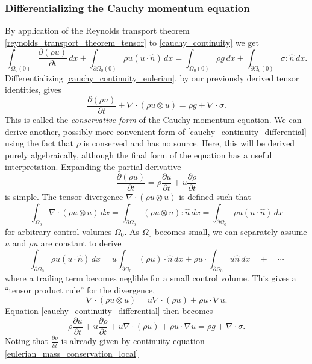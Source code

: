 \documentclass[11pt,a4paper]{memoir}
\newcommand{\pomn}{{\partial\Omega_0}}
\newcommand{\Part}[2]{\frac{\partial #1}{\partial #2}}
\begin{document}
\subsubsection{Differentializing the Cauchy momentum equation}
By application of the Reynolds transport theorem \eqref{reynolds_transport_theorem_tensor} to \eqref{cauchy_continuity} we get
\begin{equation}\label{cauchy_continuity_eulerian}
    \int_{\Omega_0(0)}\Part{(\rho u)}{t}\,dx + \int_{\partial\Omega_0(0)}\rho u (u\cdot \hat{n})\,dx = \int_{\Omega_0(0)} \rho g\,dx + \int_{\pomn(0)} \sigma:\hat{n}\,dx.
\end{equation}
Differentializing \eqref{cauchy_continuity_eulerian}, by our previously derived tensor identities, gives
\begin{equation}\label{cauchy_continuity_differential}
    \Part{(\rho u)}{t} + \nabla \cdot (\rho u\otimes u) = \rho g + \nabla\cdot\sigma.
\end{equation}
This is called the \textit{conservative form} of the Cauchy momentum equation.
We can derive another, possibly more convenient form of \eqref{cauchy_continuity_differential} using the fact that
$\rho$ is conserved and has no source. Here, this will be derived purely algebraically, although the final form of the equation
has a useful interpretation. Expanding the partial derivative
$$
    \Part{(\rho u)}{t} = \rho\Part{u}{t} + u\Part{\rho}{t}
$$
is simple. The tensor divergence $\nabla \cdot (\rho u\otimes u)$ is defined such that
$$
    \int_{\Omega_0} \nabla \cdot (\rho u\otimes u)\,dx = \int_{\pomn} (\rho u\otimes u) : \hat{n}\,dx = \int_{\pomn} \rho u (u\cdot\hat{n})\,dx
$$
for arbitrary control volumes $\Omega_0$. As $\Omega_0$ becomes small, we can separately assume $u$ and $\rho u$ are constant
to derive
$$
    \int_{\pomn} \rho u (u\cdot\hat{n})\,dx = u\int_{\pomn}(\rho u)\cdot\hat{n}\,dx
                                              + \rho u\cdot \int_{\pomn} u\hat{n}\,dx \quad+\quad\cdots
$$
where a trailing term becomes neglible for a small control volume. This gives a ``tensor product rule'' for the divergence,
\begin{equation}\label{cauchy_divergence_tensor_product}
    \nabla\cdot (\rho u \otimes u) = u\nabla\cdot (\rho u) + \rho u\cdot\nabla u.
\end{equation}
Equation \eqref{cauchy_continuity_differential} then becomes
$$
    \rho\Part{u}{t} + u\Part{\rho}{t} + u\nabla\cdot (\rho u) + \rho u\cdot\nabla u = \rho g + \nabla\cdot\sigma.
$$
Noting that $\Part{\rho}{t}$ is already given by continuity equation \eqref{eulerian_mass_conservation_local}
\end{document}
